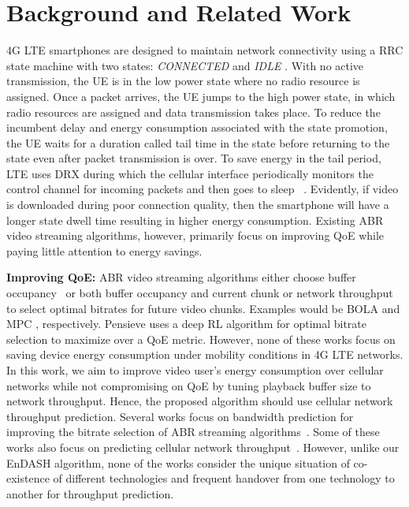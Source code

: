 \section{\textbf{Background and Related Work}}\label{sec:chap04:related_work}
\indent \ac{4G} LTE smartphones are designed to maintain network connectivity using a \ac{RRC} state machine with two states: \textit{CONNECTED} and \textit{IDLE} \cite{Huang2012}. With no active transmission, the \ac{UE} is in the low power  state where no radio resource is assigned.  Once a packet arrives, the  \ac{UE} jumps to the high power  state, in which radio resources are assigned and data transmission takes place.  To reduce the incumbent delay and energy consumption associated with the state promotion, the \ac{UE} waits for a duration called tail time in the  state before returning to the  state even after packet transmission is over. To save energy in the tail period, LTE uses  \ac{DRX} during which the cellular interface periodically monitors the control channel for incoming packets and then goes to sleep ~\cite{Huang2012}. Evidently, if video is downloaded during poor connection quality, then the smartphone will have a longer  state dwell time resulting in higher energy consumption. Existing \ac{ABR} video streaming algorithms, however, primarily focus on improving \ac{QoE} while paying little attention to energy savings.


\noindent \textbf{Improving QoE:}
\ac{ABR} video streaming algorithms either choose buffer occupancy~\cite{Huang2014,Spiteri2016}  or both buffer occupancy and current chunk or network throughput~\cite{yin2015control,Jiang2014,Sengupta2018,Xu2015,Mehr2019} to select optimal bitrates for future video chunks. Examples would be BOLA \cite{Spiteri2016} and MPC \cite{yin2015control}, respectively.
Pensieve \cite{mao2017neural} uses a deep RL algorithm for optimal bitrate selection to maximize over a \ac{QoE} metric. However, none of these  works focus on saving device energy consumption under mobility conditions in \ac{4G} LTE networks. \\
\indent In this work, we aim to improve video user's energy consumption over cellular networks while not compromising on \ac{QoE} by tuning playback buffer size to network throughput. Hence, the proposed algorithm should use cellular network throughput prediction.
Several works focus on bandwidth prediction for improving the bitrate selection of  ABR streaming algorithms~\cite{Bentaleb2019,Raca2019,Raca2018_2,yue2018linkforecast}. Some of these works also focus on predicting cellular network throughput~\cite{Raca2019,yue2018linkforecast,Raca2017,Raca2018_2,Raca2018_3,Samba2017, Ghasemi2018}. However, unlike our EnDASH algorithm, none of the works consider the unique situation of co-existence of different technologies and frequent handover from one technology to another for throughput prediction.


